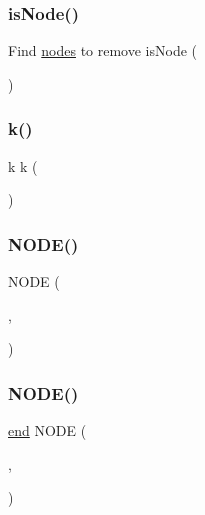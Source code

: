 \subsubsection{\texorpdfstring{is\+Node()}{isNode()}}
{\footnotesize\ttfamily Find \hyperlink{a00608_a9fd973fb7dcbed4123ae5eb2f3868e61}{nodes} to remove is\+Node (\begin{DoxyParamCaption}\item[{\hyperlink{a00605_a3891165b790964e5812b60f12517cbe9}{node\+Idx}}]{ }\end{DoxyParamCaption})}

\mbox{\label{a00605_a6086917dfee54d84abe1838505c8cf69}} 
\subsubsection{\texorpdfstring{k()}{k()}}
{\footnotesize\ttfamily k k (\begin{DoxyParamCaption}{ }\end{DoxyParamCaption})\hspace{0.3cm}{\ttfamily [virtual]}}

\mbox{\label{a00605_a16a42e57356dc625f7f62a0e3228d33e}} 
\subsubsection{\texorpdfstring{N\+O\+D\+E()}{NODE()}\hspace{0.1cm}{\footnotesize\ttfamily [1/3]}}
{\footnotesize\ttfamily N\+O\+DE (\begin{DoxyParamCaption}\item[{(\hyperlink{a00605_ae344a0a545940b078e36623bf4b44c7f}{remove\+Node}(1)+1)\+:\hyperlink{a00608_afb358f48b1646c750fb9da6c6585be2b}{end}}]{,  }\item[{\+:}]{ }\end{DoxyParamCaption})}

\mbox{\label{a00605_a06e5a2f70e4c38c9b781313f2818c3a9}} 
\subsubsection{\texorpdfstring{N\+O\+D\+E()}{NODE()}\hspace{0.1cm}{\footnotesize\ttfamily [2/3]}}
{\footnotesize\ttfamily \hyperlink{a00608_afb358f48b1646c750fb9da6c6585be2b}{end} N\+O\+DE (\begin{DoxyParamCaption}\item[{\+:}]{,  }\item[{4}]{ }\end{DoxyParamCaption})}

